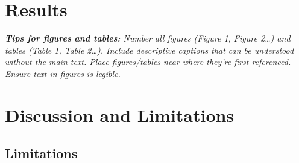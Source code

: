 \documentclass[11pt,a4paper]{article}   %
\newif\ifguidance
\newcommand{\guide}[1]{\ifguidance\textcolor{guidegray}{\itshape #1}\par\medskip\fi}
\newenvironment{guidancebox}
    {\begin{lrbox}{\gbox}\begin{minipage}{0.88\textwidth}%
     \small\color{guidegray}\itshape}
    {\end{minipage}\end{lrbox}%
     \begin{center}\setlength{\fboxsep}{10pt}%
     \fcolorbox{guidegray}{gray!6}{\usebox{\gbox}}\end{center}\medskip}
\begin{document}
\section{Results}
\guide{Present your main findings with appropriate evidence. Use figures and tables
where appropriate (we strongly encourage at least one figure). Distinguish between
observations and interpretations. Argue why your claims are robust. E.g., if your
approach ``performs better'' than alternatives: (a) Do you have enough data? Is the
difference statistically significant? (b) Is it robust? Or do small changes to your
setup cause substantial changes to your results?}

\begin{guidancebox}
\textbf{Tips for figures and tables:} Number all figures (Figure 1, Figure 2\dots)
and tables (Table 1, Table 2\dots). Include descriptive captions that can be
understood without the main text. Place figures/tables near where they're first
referenced. Ensure text in figures is legible.
\end{guidancebox}

%

\section{Discussion and Limitations}
\guide{Discuss the broader implications for AI safety. What do your results mean?
What trends do you notice and what might they indicate?}

\subsection*{Limitations}
\guide{What are the limitations of your work? What threat models or failure modes
did you not address? Be honest about constraints --- methodological limitations,
scope limitations, or aspects you couldn't fully address in the hackathon timeframe.
Explicitly note the assumptions you made, whether implicitly or explicitly, and how
the interpretation of your results would change if a given assumption did not hold.}
\end{document}

